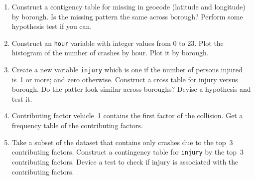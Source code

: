 \documentclass[12pt]{article}
\begin{document}
\begin{enumerate}
\item
  Construct a contigency table for missing in geocode (latitude and longitude)
  by borough. Is the missing pattern the same across borough? Perform some
  hypothesis test if you can.
\item
  Construct an \texttt{hour} variable with integer values from 0 to 23. Plot the
  histogram of the number of crashes by hour. Plot it by borough.
\item
  Create a new variable \texttt{injury} which is one if the number of persons
  injured is~1 or more; and zero otherwise. Construct a cross table for injury
  versus borough. Do the patter look similar across boroughs? Devise a
  hypothesis and test it.
\item
  Contributing factor vehicle~1 contains the first factor of the collision. Get
  a frequency table of the contributing factors.
\item
  Take a subset of the dataset that contains only crashes due to the top~3
  contributing factors. Construct a contingency table for \texttt{injury} by
  the top~3 contributing factors. Device a test to check if injury is associated
  with the contributing factors.  
\end{enumerate}
\end{document}
